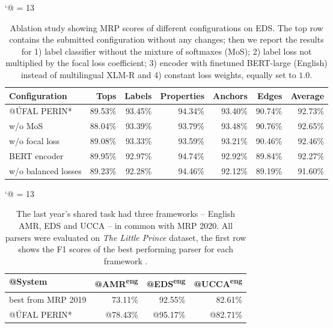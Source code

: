 \documentclass[11pt,a4paper]{article}
\begin{document}
\begin{table*}[t!]
\centering
\catcode`@ = 13
\small
\begin{tabular}{@{}lrrrrrr@{}}
\toprule
\textbf{Configuration}     & \textbf{Tops}    & \textbf{Labels}  & \textbf{Properties} & \textbf{Anchors} & \textbf{Edges}   & \textbf{Average} \\ \midrule
@ÚFAL PERIN*             & 89.53\%  & 93.45\%  & 94.34\%  & 93.40\%  & 90.74\%  & 92.73\% \\
w/o MoS             & 88.04\%  & 93.39\%  & 93.79\%  & 93.48\%  & 90.76\%  & 92.65\% \\
w/o focal loss      & 89.08\%  & 93.33\%  & 93.59\%  & 93.21\%  & 90.46\%  & 92.46\% \\
BERT encoder        & 89.95\%  & 92.97\%  & 94.74\%  & 92.92\%  & 89.84\%  & 92.27\% \\
w/o balanced losses & 89.23\%  & 92.28\%  & 94.46\%  & 92.12\%  & 89.19\%  & 91.60\% \\
\bottomrule
\end{tabular}\caption{Ablation study showing MRP scores of different configurations on EDS. The top row contains the submitted configuration without any changes; then we report the results for 1) label classifier without the mixture of softmaxes (MoS); 2) label loss not multiplied by the focal loss coefficient; 3) encoder with finetuned BERT-large (English) instead of multilingual XLM-R and 4) constant loss weights, equally set to $1.0$.}
\label{tab:ablation}
\end{table*}

\begin{table}[t]
\small
\centering
\catcode`@ = 13
\begin{tabular}{@{}lrrr@{}}
\toprule
@System          & @AMR\textsuperscript{eng} & @EDS\textsuperscript{eng} & @UCCA\textsuperscript{eng} \\ \midrule
best from MRP 2019 &  73.11\% &  92.55\% &  82.61\% \\
@ÚFAL PERIN*          & @78.43\% & @95.17\% & @82.71\% \\ \bottomrule
\end{tabular}
\caption{The last year's shared task had three frameworks -- English AMR, EDS and UCCA -- in common with MRP 2020. All parsers were evaluated on \emph{The Little Prince} dataset, the first row shows the F1 scores of the best performing parser for each framework \cite{Oep:Abe:Haj:19}.}
\label{tab:prince}
\end{table}
\end{document}
